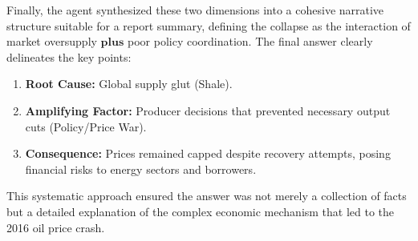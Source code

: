 Finally, the agent synthesized these two dimensions into a cohesive narrative structure suitable for a report summary, defining the collapse as the interaction of market oversupply $\textbf{plus}$ poor policy coordination. The final answer clearly delineates the key points:

\begin{enumerate}
\item \textbf{Root Cause:} Global supply glut (Shale).
\item \textbf{Amplifying Factor:} Producer decisions that prevented necessary output cuts (Policy/Price War).
\item \textbf{Consequence:} Prices remained capped despite recovery attempts, posing financial risks to energy sectors and borrowers.
\end{enumerate}

This systematic approach ensured the answer was not merely a collection of facts but a detailed explanation of the complex economic mechanism that led to the 2016 oil price crash.
